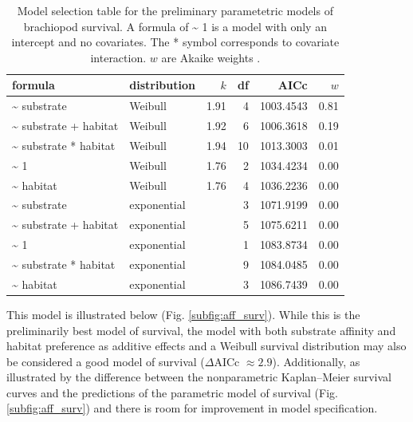 \documentclass[12pt,letterpaper]{article}
\begin{document}
\begin{table}[ht]
  \centering
  \begin{tabular}{llrrrr}
    \hline
    formula & distribution & \(k\) & df & AICc & \(w\) \\ 
    \hline
    \~{} substrate & Weibull & 1.91 & 4 & 1003.4543 & 0.81 \\ 
    \~{} substrate + habitat & Weibull & 1.92 & 6 & 1006.3618 & 0.19 \\ 
    \~{} substrate * habitat & Weibull & 1.94 & 10 & 1013.3003 & 0.01 \\ 
    \~{} 1 & Weibull & 1.76 & 2 & 1034.4234 & 0.00 \\ 
    \~{} habitat & Weibull & 1.76 & 4 & 1036.2236 & 0.00 \\ 
    \~{} substrate & exponential &  & 3 & 1071.9199 & 0.00 \\ 
    \~{} substrate + habitat & exponential &  & 5 & 1075.6211 & 0.00 \\ 
    \~{} 1 & exponential &  & 1 & 1083.8734 & 0.00 \\ 
    \~{} substrate * habitat & exponential &  & 9 & 1084.0485 & 0.00 \\ 
    \~{} habitat & exponential &  & 3 & 1086.7439 & 0.00 \\ 
    \hline
  \end{tabular}
  \caption[Brachiopod survival models]{Model selection table for the preliminary parametetric models of brachiopod survival. A formula of \~{} 1 is a model with only an intercept and no covariates. The * symbol corresponds to covariate interaction. \(w\) are Akaike weights \citep{Burnham2002a}.}
  \label{tab:bracmod}
\end{table}


This model is illustrated below (Fig. \ref{subfig:aff_surv}). While this is the preliminarily best model of survival, the model with both substrate affinity and habitat preference as additive effects and a Weibull survival distribution may also be considered a good model of survival (\(\Delta\)AICc \(\approx 2.9\)). Additionally, as illustrated by the difference between the nonparametric Kaplan--Meier survival curves and the predictions of the parametric model of survival (Fig. \ref{subfig:aff_surv}) and there is room for improvement in model specification.
\end{document}
